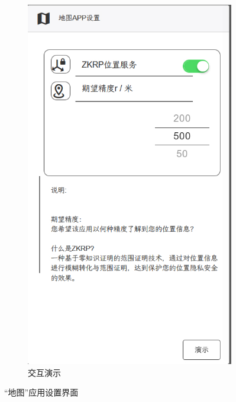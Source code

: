 \documentclass[zihao=-4]{ctexart}
\begin{document}
\begin{figure}[htbp]
\begin{subfigure}{0.31\textwidth}
    \includegraphics[width=\linewidth]{前端-3.jpg}
    \caption{交互演示}
  \end{subfigure}
\caption{“地图”应用设置界面}
\label{地图应用}
\end{figure}
\end{document}

